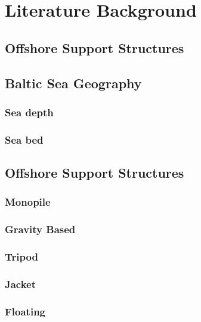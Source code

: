 \chapter{Literature Background}


\section{Offshore Support Structures}






\section{Baltic Sea Geography}

\subsection*{Sea depth}

\subsection*{Sea bed}

\section{Offshore Support Structures}

\subsection*{Monopile}

\subsection*{Gravity Based}

\subsection*{Tripod}

\subsection*{Jacket}

\subsection*{Floating}







